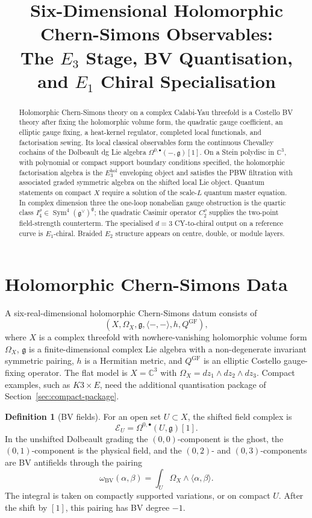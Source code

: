 \documentclass[11pt]{article}
\title{Six-Dimensional Holomorphic Chern-Simons Observables:\\
The \(E_3\) Stage, BV Quantisation, and \(E_1\) Chiral Specialisation}
\author{}
\date{}
\providecommand{\C}{\mathbb{C}}
\providecommand{\fg}{\mathfrak{g}}
\providecommand{\Sym}{\operatorname{Sym}}
\providecommand{\BV}{\operatorname{BV}}
\providecommand{\cE}{\mathcal{E}}
\theoremstyle{plain}
\theoremstyle{definition}
\newtheorem{definition}[theorem]{Definition}
\theoremstyle{remark}
\begin{document}
\maketitle

\begin{abstract}
Holomorphic Chern-Simons theory on a complex Calabi-Yau threefold is a
Costello BV theory after fixing the holomorphic volume form, the
quadratic gauge coefficient, an elliptic gauge fixing, a heat-kernel
regulator, completed local functionals, and factorisation sewing. Its
local classical observables form the continuous Chevalley cochains of
the Dolbeault dg Lie algebra
\(\Omega^{0,\bullet}(-,\fg)[1]\). On a Stein polydisc in \(\C^3\), with
polynomial or compact support boundary conditions specified, the
holomorphic factorisation algebra is the \(E_3^{\mathrm{hol}}\)
enveloping object and satisfies the PBW filtration with associated
graded symmetric algebra on the shifted local Lie object. Quantum
statements on compact \(X\) require a solution of the scale-\(L\)
quantum master equation. In complex dimension three the one-loop
nonabelian gauge obstruction is the quartic class
\(I_4^\rho\in\Sym^4(\fg^\vee)^\fg\); the quadratic Casimir operator
\(C_2^\rho\) supplies the two-point field-strength counterterm. The
specialised \(d=3\) CY-to-chiral output on a reference curve is
\(E_1\)-chiral. Braided \(E_2\) structure appears on centre, double, or
module layers.
\end{abstract}

\tableofcontents

\section{Holomorphic Chern-Simons Data}
\label{sec:hcs-data}

A six-real-dimensional holomorphic Chern-Simons datum consists of
\[
  (X,\Omega_X,\fg,\langle-,-\rangle,h,Q^{\mathrm{GF}}),
\]
where \(X\) is a complex threefold with nowhere-vanishing holomorphic
volume form \(\Omega_X\), \(\fg\) is a finite-dimensional complex Lie
algebra with a non-degenerate invariant symmetric pairing, \(h\) is a
Hermitian metric, and \(Q^{\mathrm{GF}}\) is an elliptic Costello
gauge-fixing operator. The flat model is \(X=\C^3\) with
\(\Omega_X=dz_1\wedge dz_2\wedge dz_3\). Compact examples, such as
\(K3\times E\), need the additional quantisation package of
Section~\ref{sec:compact-package}.

\begin{definition}[BV fields]
\label{def:bv-fields}
For an open set \(U\subset X\), the shifted field complex is
\[
  \cE_U=\Omega^{0,\bullet}(U,\fg)[1].
\]
In the unshifted Dolbeault grading the \((0,0)\)-component is the
ghost, the \((0,1)\)-component is the physical field, and the
\((0,2)\)- and \((0,3)\)-components are BV antifields through the
pairing
\[
  \omega_{\BV}(\alpha,\beta)
  =
  \int_U\Omega_X\wedge\langle\alpha,\beta\rangle.
\]
The integral is taken on compactly supported variations, or on compact
\(U\). After the shift by \([1]\), this pairing has BV degree \(-1\).
\end{definition}
\end{document}
